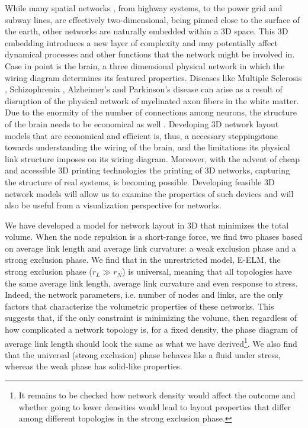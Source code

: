\documentclass[nofootinbib,preprint,floatfix,titlepage,endfloats]{revtex4} %
\begin{document}

While many spatial networks \cite{barthelemy2011spatial}, from highway systems, to the power grid and subway lines, are effectively two-dimensional, 
being pinned close to the surface of the earth, other networks are naturally embedded within a 3D space. 
This 3D embedding introduces a new layer of complexity and may potentially affect dynamical processes and other functions that the network might be involved in. Case in point is the brain, a three dimensional physical network in which the wiring diagram determines its featured properties. 
Diseases like Multiple Sclerosis \cite{compston2008ms,miller2007ms,miller2005ms}, Schizophrenia \cite{davis2003white,lim1999compromised,sigmundsson2001structural}, Alzheimer's \cite{mudher2002alzheimer,goedert1991tau,goedert1992tau} and Parkinson's disease \cite{bohnen2011white,beyer2006visual,hattori2012cognitive} can arise as a result of disruption of the physical network of myelinated axon fibers in the white matter. 
Due to the enormity of the number of connections among neurons, the structure of the brain needs to be economical as well \cite{bullmore2012economy,sporns2004organization,kotter2001connectional}. Developing 3D network layout models that are economical and efficient is, thus, a necessary steppingstone towards understanding the wiring of the brain, and the limitations its physical link structure imposes on its wiring diagram. 
Moreover, with the advent of cheap and accessible 3D printing technologies the printing of 3D networks, capturing the structure of real systems, is becoming possible. 
Developing feasible 3D network models will allow us to examine the properties of such devices and will also be useful from a visualization perspective for networks.

We have developed a model for network layout in 3D that minimizes the total volume. 
When the node repulsion is a short-range force, we find two phases based on average link length and average link curvature: a weak exclusion phase and a strong exclusion phase. 
We find that in the unrestricted model, E-ELM, the strong exclusion phase ($r_L \gg r_N$) is universal, meaning that all topologies have the same average link length, average link curvature and even response to stress. 
Indeed, the network parameters, i.e. number of nodes and links, are the only factors that characterize the volumetric properties of these networks. 
This suggests that, if the only constraint is minimizing the volume, then regardless of how complicated a network topology is, for a fixed density, the phase diagram of average link length should look the same as what we have derived\footnote{
It remains to be checked how network density would affect the outcome and whether going to lower densities would lead to layout properties that differ among different topologies in the strong exclusion phase.}.
We also find that the universal (strong exclusion) phase behaves like a fluid under stress, whereas the weak phase has solid-like properties. 
\end{document}
